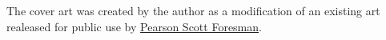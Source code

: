 The cover art was created by the author as a modification of an existing art realeased for public use by \href{https://commons.wikimedia.org/wiki/File:Tapir_(PSF).svg}{Pearson Scott Foresman}.
